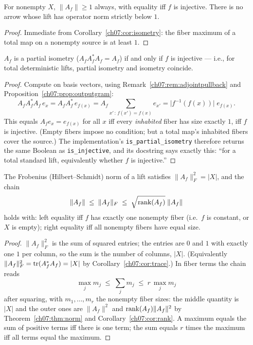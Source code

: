 \begin{corollary}\label{ch07:cor:nocontraction}
For nonempty $X$, $\lVert A_f\rVert\ge 1$ always, with equality iff $f$ is
injective. There is no arrow whose lift has operator norm strictly below
$1$.
\end{corollary}

\begin{proof}
Immediate from Corollary~\ref{ch07:cor:isometry}: the fiber maximum of a
total map on a nonempty source is at least $1$.
\end{proof}

\begin{corollary}\label{ch07:cor:partialisometry}
$A_f$ is a partial isometry ($A_fA_f^*A_f=A_f$) if and only if $f$ is
injective --- i.e., for total deterministic lifts, partial isometry and
isometry coincide.
\end{corollary}

\begin{proof}
Compute on basis vectors, using
Remark~\ref{ch07:rem:adjointpullback} and
Proposition~\ref{ch07:prop:outputgram}:
\[
A_fA_f^*A_f\,e_x
= A_fA_f^*\,e_{f(x)}
= A_f\!\!\sum_{x'\,:\,f(x')=f(x)}\!\! e_{x'}
= \bigl|f^{-1}(f(x))\bigr|\; e_{f(x)} .
\]
This equals $A_fe_x=e_{f(x)}$ for all $x$ iff every \emph{inhabited} fiber
has size exactly $1$, iff $f$ is injective. (Empty fibers impose no
condition; but a total map's inhabited fibers cover the source.) The
implementation's \texttt{is\_partial\_isometry} therefore returns the same
Boolean as \texttt{is\_injective}, and its docstring says exactly this:
``for a total standard lift, equivalently whether $f$ is injective.''
\end{proof}

\begin{corollary}\label{ch07:cor:frobenius}
The Frobenius (Hilbert--Schmidt) norm of a lift satisfies
$\lVert A_f\rVert_F^2=|X|$, and the chain
\[
\lVert A_f\rVert \;\le\; \lVert A_f\rVert_F \;\le\;
\sqrt{\mathrm{rank}(A_f)}\;\lVert A_f\rVert
\]
holds with: left equality iff $f$ has exactly one nonempty fiber (i.e.\ $f$
is constant, or $X$ is empty); right equality iff all nonempty fibers have
equal size.
\end{corollary}

\begin{proof}
$\lVert A_f\rVert_F^2$ is the sum of squared entries; the entries are $0$
and $1$ with exactly one $1$ per column, so the sum is the number of
columns, $|X|$. (Equivalently
$\lVert A_f\rVert_F^2=\mathrm{tr}(A_f^*A_f)=|X|$ by
Corollary~\ref{ch07:cor:trace}.) In fiber terms the chain reads
\[
\max_j m_j \;\le\; \sum_j m_j \;\le\; r\,\max_j m_j
\]
after squaring, with $m_1,\dots,m_r$ the nonempty fiber sizes: the middle
quantity is $|X|$ and the outer ones are $\lVert A_f\rVert^2$ and
$\mathrm{rank}(A_f)\lVert A_f\rVert^2$ by Theorem~\ref{ch07:thm:norm} and
Corollary~\ref{ch07:cor:rank}. A maximum equals the sum of positive terms
iff there is one term; the sum equals $r$ times the maximum iff all terms
equal the maximum.
\end{proof}

